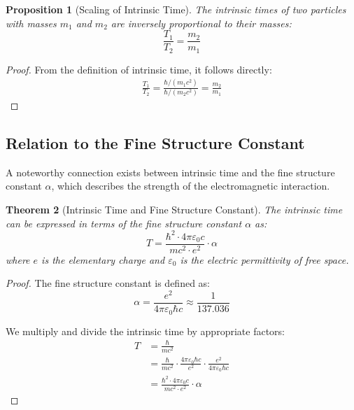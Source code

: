 \documentclass[a4paper,12pt]{article}
\newtheorem{theorem}{Theorem}[section]
\newtheorem{proposition}[theorem]{Proposition}
\begin{document}
	\begin{proposition}[Scaling of Intrinsic Time]
		The intrinsic times of two particles with masses \( m_1 \) and \( m_2 \) are inversely proportional to their masses:
		\begin{equation}
			\frac{T_1}{T_2} = \frac{m_2}{m_1}
		\end{equation}
	\end{proposition}
	
	\begin{proof}
		From the definition of intrinsic time, it follows directly:
		\begin{align}
			\frac{T_1}{T_2} = \frac{\hbar/(m_1 c^2)}{\hbar/(m_2 c^2)} = \frac{m_2}{m_1}
		\end{align}
	\end{proof}
	
	\subsection{Relation to the Fine Structure Constant}
	
	A noteworthy connection exists between intrinsic time and the fine structure constant \( \alpha \), which describes the strength of the electromagnetic interaction.
	
	\begin{theorem}[Intrinsic Time and Fine Structure Constant]
		The intrinsic time can be expressed in terms of the fine structure constant \( \alpha \) as:
		\begin{equation}
			T = \frac{\hbar^2 \cdot 4\pi \varepsilon_0 c}{m c^2 \cdot e^2} \cdot \alpha
		\end{equation}
		where \( e \) is the elementary charge and \( \varepsilon_0 \) is the electric permittivity of free space.
	\end{theorem}
	
	\begin{proof}
		The fine structure constant is defined as:
		\begin{equation}
			\alpha = \frac{e^2}{4\pi \varepsilon_0 \hbar c} \approx \frac{1}{137.036}
		\end{equation}
		
		We multiply and divide the intrinsic time by appropriate factors:
		\begin{align}
			T &= \frac{\hbar}{m c^2} \\
			&= \frac{\hbar}{m c^2} \cdot \frac{4\pi \varepsilon_0 \hbar c}{e^2} \cdot \frac{e^2}{4\pi \varepsilon_0 \hbar c} \\
			&= \frac{\hbar^2 \cdot 4\pi \varepsilon_0 c}{m c^2 \cdot e^2} \cdot \alpha
		\end{align}
	\end{proof}
	
\end{document}
